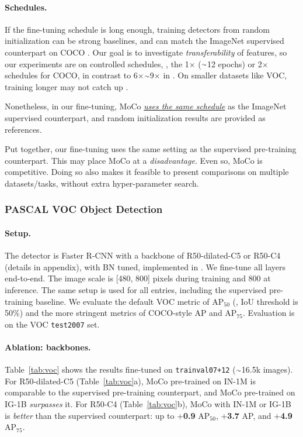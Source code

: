 \documentclass[10pt,twocolumn,letterpaper]{article}
\newcommand{\app}{\raise.17ex\hbox{$\scriptstyle\sim$}}
\def\x{\times}
\newcommand{\appdx}{appendix}
\begin{document}
\paragraph{Schedules.} If the fine-tuning schedule is long enough, training detectors from random initialization can be strong baselines, and can match the ImageNet supervised counterpart on COCO \cite{He2019}. Our goal is to investigate \emph{transferability} of features, so our experiments are on controlled schedules, \eg, the 1$\x$ ($\app$12 epochs) or 2$\x$ schedules \cite{Detectron2018} for COCO, in contrast to 6$\x$$\app$9$\x$ in \cite{He2019}. On smaller datasets like VOC, training longer may not catch up \cite{He2019}.

Nonetheless, in our fine-tuning, MoCo \ul{\emph{uses the same schedule}} as the ImageNet supervised counterpart, and random initialization results are provided as references.

\vspace{.5em}
Put together, our fine-tuning uses the same setting as the supervised pre-training counterpart. This may place MoCo at a \emph{disadvantage}. Even so, MoCo is competitive. Doing so also makes it feasible to present comparisons on multiple datasets/tasks, without extra hyper-parameter search.

\vspace{-.5em}
\subsubsection{PASCAL VOC Object Detection}

\paragraph{Setup.}
The detector is Faster R-CNN \cite{Ren2015} with a backbone of R50-dilated-C5 or R50-C4 \cite{He2017} (details in \appdx), with BN tuned, implemented in \cite{Wu2019}.
We fine-tune all layers end-to-end. The image scale is [480, 800] pixels during training and 800 at inference. The same setup is used for all entries, including the supervised pre-training baseline.
We evaluate the default VOC metric of AP$_\text{50}$ (\ie, IoU threshold is 50\%) and the more stringent metrics of COCO-style AP and AP$_\text{75}$. Evaluation is on the VOC \texttt{test2007} set.

\paragraph{Ablation: backbones.}
Table~\ref{tab:voc} shows the results fine-tuned on \texttt{trainval07+12} ($\app$16.5k images).
For R50-dilated-C5 (Table~\ref{tab:voc}a), MoCo pre-trained on IN-1M is \mbox{comparable} to the supervised pre-training counterpart, and MoCo pre-trained on IG-1B \emph{surpasses} it.
For R50-C4 (Table~\ref{tab:voc}b), MoCo with IN-1M or IG-1B is \emph{better} than the supervised counterpart: up to +\textbf{0.9} AP$_\text{50}$, +\textbf{3.7} AP, and +\textbf{4.9} AP$_\text{75}$.
\end{document}

